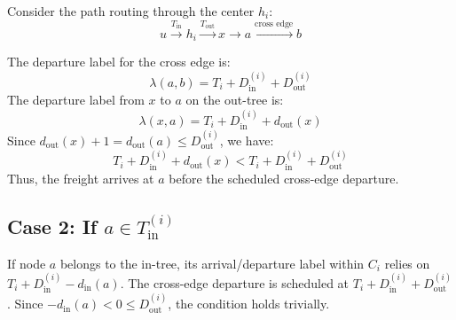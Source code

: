 \documentclass[11pt]{article}
\begin{document}
Consider the path routing through the center $h_i$:
\[
    u \xrightarrow{T_{\mathrm{in}}} h_i \xrightarrow{T_{\mathrm{out}}} x \to a \xrightarrow{\text{cross edge}} b
\]

The departure label for the cross edge is:
\[
    \lambda(a,b) = T_i + D_{\mathrm{in}}^{(i)} + D_{\mathrm{out}}^{(i)}
\]
The departure label from $x$ to $a$ on the out-tree is:
\[
    \lambda(x,a) = T_i + D_{\mathrm{in}}^{(i)} + d_{\mathrm{out}}(x)
\]
Since $d_{\mathrm{out}}(x) + 1 = d_{\mathrm{out}}(a) \le D_{\mathrm{out}}^{(i)}$, we have:
\[
    T_i + D_{\mathrm{in}}^{(i)} + d_{\mathrm{out}}(x) < T_i + D_{\mathrm{in}}^{(i)} + D_{\mathrm{out}}^{(i)}
\]
Thus, the freight arrives at $a$ before the scheduled cross-edge departure.

\vspace{1em}
\begin{center}
\end{center}

\vspace{2em}

\subsection*{Case 2: If $a \in T_{\mathrm{in}}^{(i)}$}

If node $a$ belongs to the in-tree, its arrival/departure label within $C_i$ relies on $T_i + D_{\mathrm{in}}^{(i)} - d_{\mathrm{in}}(a)$. The cross-edge departure is scheduled at $T_i + D_{\mathrm{in}}^{(i)} + D_{\mathrm{out}}^{(i)}$. Since $-d_{\mathrm{in}}(a) < 0 \le D_{\mathrm{out}}^{(i)}$, the condition holds trivially.
\end{document}
